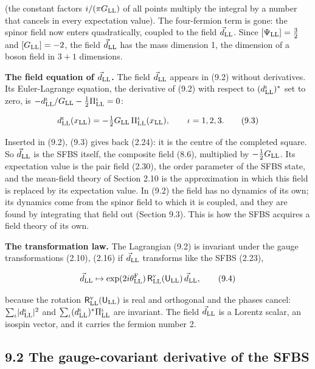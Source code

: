 \documentclass[
  10pt,
]{article}
\begin{document}
(the constant factors \(i/(\pi G_{\rm LL})\) of all points multiply the
integral by a number that cancels in every expectation value). The
four-fermion term is gone: the spinor field now enters quadratically,
coupled to the field \(\vec d_{\rm LL}\). Since
\([\Psi_{\rm LL}]=\tfrac32\) and \([G_{\rm LL}]=-2\), the field
\(\vec d_{\rm LL}\) has the mass dimension 1, the dimension of a boson
field in \(3+1\) dimensions.

\textbf{The field equation of \(\vec d_{\rm LL}\).} The field
\(\vec d_{\rm LL}\) appears in (9.2) without derivatives. Its
Euler-Lagrange equation, the derivative of (9.2) with respect to
\((d^\iota_{\rm LL})^*\) set to zero, is
\(-d^\iota_{\rm LL}/G_{\rm LL}-\tfrac12\Pi^\iota_{\rm LL}=0\):

\[d^\iota_{\rm LL}(x_{\rm LL})=-\tfrac12G_{\rm LL}\,\Pi^\iota_{\rm LL}(x_{\rm LL}),\qquad\iota=1,2,3.\tag{9.3}\]

Inserted in (9.2), (9.3) gives back (2.24): it is the centre of the
completed square. So \(\vec d_{\rm LL}\) is the SFBS itself, the
composite field (8.6), multiplied by \(-\tfrac12G_{\rm LL}\). Its
expectation value is the pair field (2.30), the order parameter of the
SFBS state, and the mean-field theory of Section 2.10 is the
approximation in which this field is replaced by its expectation value.
In (9.2) the field has no dynamics of its own; its dynamics come from
the spinor field to which it is coupled, and they are found by
integrating that field out (Section 9.3). This is how the SFBS acquires
a field theory of its own.

\textbf{The transformation law.} The Lagrangian (9.2) is invariant under
the gauge transformations (2.10), (2.16) if \(\vec d_{\rm LL}\)
transforms like the SFBS (2.23),

\[\vec d_{\rm LL}\mapsto\exp(2i\theta^{\rm F}_{\rm LL})\,\mathsf R^{\rm v}_{\rm LL}(\mathsf U_{\rm LL})\,\vec d_{\rm LL},\tag{9.4}\]

because the rotation \(\mathsf R^{\rm v}_{\rm LL}(\mathsf U_{\rm LL})\)
is real and orthogonal and the phases cancel:
\(\sum_\iota\lvert d^\iota_{\rm LL}\rvert^2\) and
\(\sum_\iota(d^\iota_{\rm LL})^*\Pi^\iota_{\rm LL}\) are invariant. The
field \(\vec d_{\rm LL}\) is a Lorentz scalar, an isospin vector, and it
carries the fermion number 2.

\hypertarget{the-gauge-covariant-derivative-of-the-sfbs}{%
\subsection{9.2 The gauge-covariant derivative of the
SFBS}\label{the-gauge-covariant-derivative-of-the-sfbs}}
\end{document}
